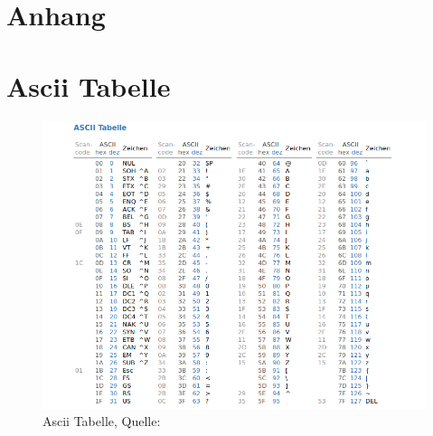 \documentclass[11pt,a4paper,ngerman, fleqn]{article}
\begin{document}
\newpage
\appendix
\section*{Anhang}

\section{Ascii Tabelle}
\label{sec:A}

\begin{figure}[H]
	\centering
	\includegraphics[width=1\textwidth]{ascii.png}
	\caption{Ascii Tabelle, Quelle: \cite{1}}
	\label{fig:1}
\end{figure}
\end{document}
